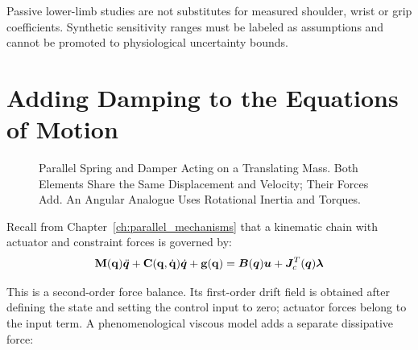 Passive lower-limb studies are not substitutes for measured shoulder, wrist or grip coefficients. Synthetic sensitivity ranges must be labeled as assumptions and cannot be promoted to physiological uncertainty bounds. \section{Adding Damping to the Equations of Motion} \label{sec:damping_eom}


\begin{figure}[htbp]
\centering
{}
\caption{Parallel Spring and Damper Acting on a Translating Mass. Both Elements Share the Same Displacement and Velocity; Their Forces Add. An Angular Analogue Uses Rotational Inertia and Torques.}
\label{fig:damping_model}
\end{figure}

Recall from Chapter~\ref{ch:parallel_mechanisms} that a kinematic chain with actuator and constraint forces is governed by:
\[
\mathbf{M}(\mathbf{q})\ddot{\bm{q}} + \mathbf{C}(\mathbf{q},\dot{\mathbf{q}})\dot{\bm{q}} + \mathbf{g}(\mathbf{q}) = \bm{B}(\bm{q})\bm{u} + \bm{J}_c^T(\bm{q})\boldsymbol{\lambda}
\]

This is a second-order force balance. Its first-order drift field is obtained after defining the state and setting the control input to zero; actuator forces belong to the input term. A phenomenological viscous model adds a separate dissipative force:

